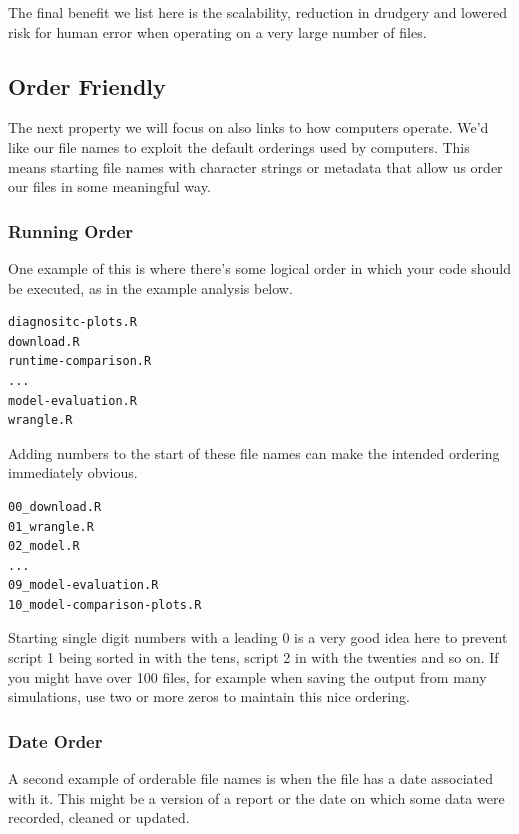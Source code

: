 \documentclass[
  letterpaper,
  DIV=11,
  numbers=noendperiod]{scrreprt}
\begin{document}
The final benefit we list here is the scalability, reduction in drudgery
and lowered risk for human error when operating on a very large number
of files.

\subsection{Order Friendly}\label{order-friendly}

The next property we will focus on also links to how computers operate.
We'd like our file names to exploit the default orderings used by
computers. This means starting file names with character strings or
metadata that allow us order our files in some meaningful way.

\subsubsection{Running Order}\label{running-order}

One example of this is where there's some logical order in which your
code should be executed, as in the example analysis below.

\begin{verbatim}
diagnositc-plots.R
download.R
runtime-comparison.R
...
model-evaluation.R
wrangle.R
\end{verbatim}

Adding numbers to the start of these file names can make the intended
ordering immediately obvious.

\begin{verbatim}
00_download.R
01_wrangle.R
02_model.R
...
09_model-evaluation.R
10_model-comparison-plots.R
\end{verbatim}

Starting single digit numbers with a leading 0 is a very good idea here
to prevent script 1 being sorted in with the tens, script 2 in with the
twenties and so on. If you might have over 100 files, for example when
saving the output from many simulations, use two or more zeros to
maintain this nice ordering.

\subsubsection{Date Order}\label{naming-things-date-order}

A second example of orderable file names is when the file has a date
associated with it. This might be a version of a report or the date on
which some data were recorded, cleaned or updated.
\end{document}
